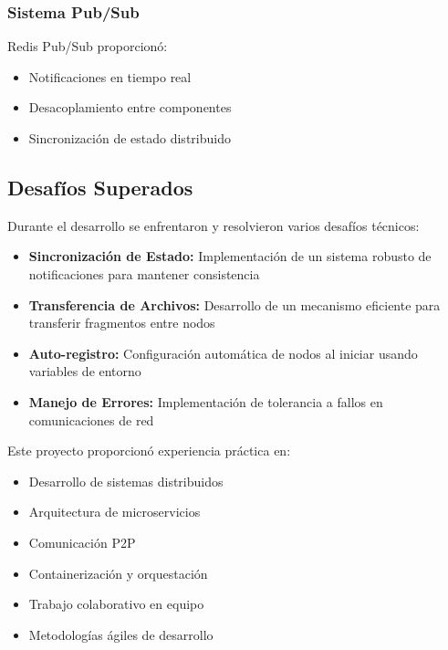 \subsubsection*{Sistema Pub/Sub}
Redis Pub/Sub proporcionó:
\begin{itemize}
    \item Notificaciones en tiempo real
    \item Desacoplamiento entre componentes
    \item Sincronización de estado distribuido
\end{itemize}

\subsection*{Desafíos Superados}

Durante el desarrollo se enfrentaron y resolvieron varios desafíos técnicos:

\begin{itemize}
    \item \textbf{Sincronización de Estado:} Implementación de un sistema robusto de notificaciones para mantener consistencia
    \item \textbf{Transferencia de Archivos:} Desarrollo de un mecanismo eficiente para transferir fragmentos entre nodos
    \item \textbf{Auto-registro:} Configuración automática de nodos al iniciar usando variables de entorno
    \item \textbf{Manejo de Errores:} Implementación de tolerancia a fallos en comunicaciones de red
\end{itemize}



Este proyecto proporcionó experiencia práctica en:

\begin{itemize}
    \item Desarrollo de sistemas distribuidos
    \item Arquitectura de microservicios
    \item Comunicación P2P
    \item Containerización y orquestación
    \item Trabajo colaborativo en equipo
    \item Metodologías ágiles de desarrollo
\end{itemize}

